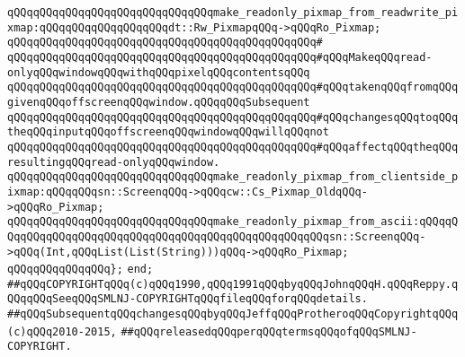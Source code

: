 \verb|qQQqqQQqqQQqqQQqqQQqqQQqqQQqqQQqmake_readonly_pixmap_from_readwrite_pixmap:qQQqqQQqqQQqqQQqqQQqdt::Rw_PixmapqQQq->qQQqRo_Pixmap;|\newline
\verb|qQQqqQQqqQQqqQQqqQQqqQQqqQQqqQQqqQQqqQQqqQQqqQQq#|\newline
\verb|qQQqqQQqqQQqqQQqqQQqqQQqqQQqqQQqqQQqqQQqqQQqqQQq#qQQqMakeqQQqread-onlyqQQqwindowqQQqwithqQQqpixelqQQqcontentsqQQq|\newline
\verb|qQQqqQQqqQQqqQQqqQQqqQQqqQQqqQQqqQQqqQQqqQQqqQQq#qQQqtakenqQQqfromqQQqgivenqQQqoffscreenqQQqwindow.qQQqqQQqSubsequent|\newline
\verb|qQQqqQQqqQQqqQQqqQQqqQQqqQQqqQQqqQQqqQQqqQQqqQQq#qQQqchangesqQQqtoqQQqtheqQQqinputqQQqoffscreenqQQqwindowqQQqwillqQQqnot|\newline
\verb|qQQqqQQqqQQqqQQqqQQqqQQqqQQqqQQqqQQqqQQqqQQqqQQq#qQQqaffectqQQqtheqQQqresultingqQQqread-onlyqQQqwindow.|\newline
\newline
\verb|qQQqqQQqqQQqqQQqqQQqqQQqqQQqqQQqmake_readonly_pixmap_from_clientside_pixmap:qQQqqQQqsn::ScreenqQQq->qQQqcw::Cs_Pixmap_OldqQQq->qQQqRo_Pixmap;|\newline
\verb|qQQqqQQqqQQqqQQqqQQqqQQqqQQqqQQqmake_readonly_pixmap_from_ascii:qQQqqQQqqQQqqQQqqQQqqQQqqQQqqQQqqQQqqQQqqQQqqQQqqQQqqQQqsn::ScreenqQQq->qQQq(Int,qQQqList(List(String)))qQQq->qQQqRo_Pixmap;|\newline
\verb|qQQqqQQqqQQqqQQq};|\newline
\verb|end;|\newline
\newline
\verb|##qQQqCOPYRIGHTqQQq(c)qQQq1990,qQQq1991qQQqbyqQQqJohnqQQqH.qQQqReppy.qQQqqQQqSeeqQQqSMLNJ-COPYRIGHTqQQqfileqQQqforqQQqdetails.|\newline
\verb|##qQQqSubsequentqQQqchangesqQQqbyqQQqJeffqQQqProtheroqQQqCopyrightqQQq(c)qQQq2010-2015,|\newline
\verb|##qQQqreleasedqQQqperqQQqtermsqQQqofqQQqSMLNJ-COPYRIGHT.|\newline

